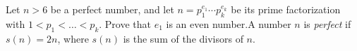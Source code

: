 \documentclass{article}
\begin{document}
\setlength{\parindent}{0pt}
Let $n > 6$ be a perfect number, and let $n = p_1^{e_1} \cdots p_k^{e_k}$ be its prime factorization with $1 < p_1 < \ldots < p_k$. Prove that $e_1$ is an even number.\newline\newline A number $n$ is \emph{perfect} if $s(n) = 2n$, where $s(n)$ is the sum of the divisors of $n$.
\end{document}

